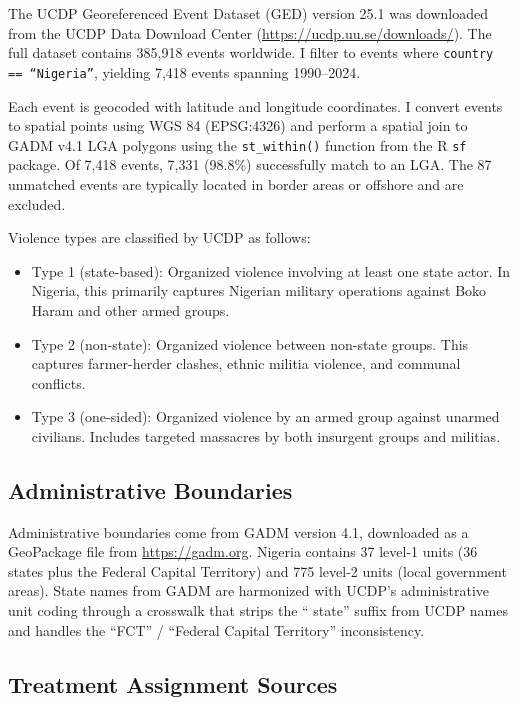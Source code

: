 \documentclass[12pt]{article}
\begin{document}
The UCDP Georeferenced Event Dataset (GED) version 25.1 was downloaded from the UCDP Data Download Center (\url{https://ucdp.uu.se/downloads/}). The full dataset contains 385,918 events worldwide. I filter to events where \texttt{country == ``Nigeria''}, yielding 7,418 events spanning 1990--2024.

Each event is geocoded with latitude and longitude coordinates. I convert events to spatial points using WGS 84 (EPSG:4326) and perform a spatial join to GADM v4.1 LGA polygons using the \texttt{st\_within()} function from the R \texttt{sf} package. Of 7,418 events, 7,331 (98.8\%) successfully match to an LGA. The 87 unmatched events are typically located in border areas or offshore and are excluded.

Violence types are classified by UCDP as follows:
\begin{itemize}
\item Type 1 (state-based): Organized violence involving at least one state actor. In Nigeria, this primarily captures Nigerian military operations against Boko Haram and other armed groups.
\item Type 2 (non-state): Organized violence between non-state groups. This captures farmer-herder clashes, ethnic militia violence, and communal conflicts.
\item Type 3 (one-sided): Organized violence by an armed group against unarmed civilians. Includes targeted massacres by both insurgent groups and militias.
\end{itemize}

\subsection{Administrative Boundaries}

Administrative boundaries come from GADM version 4.1, downloaded as a GeoPackage file from \url{https://gadm.org}. Nigeria contains 37 level-1 units (36 states plus the Federal Capital Territory) and 775 level-2 units (local government areas). State names from GADM are harmonized with UCDP's administrative unit coding through a crosswalk that strips the `` state'' suffix from UCDP names and handles the ``FCT'' / ``Federal Capital Territory'' inconsistency.

\subsection{Treatment Assignment Sources}
\end{document}
